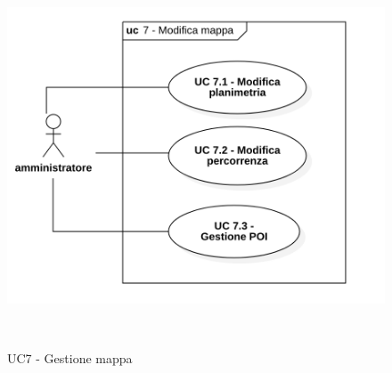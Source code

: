 \begin{figure}[H]

​    \centering

​    \includegraphics[scale=0.52]{res/images/uc7.png}

​    \caption{UC7 - Gestione mappa}

\end{figure}



